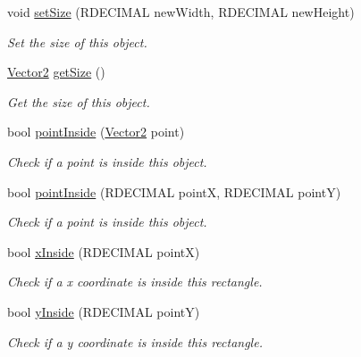 \begin{DoxyCompactItemize}
void \hyperlink{class_rad_j_a_v_1_1_rectangle_a0c7a61678b2d5b3b91207982f4895739}{set\+Size} (R\+D\+E\+C\+I\+M\+AL new\+Width, R\+D\+E\+C\+I\+M\+AL new\+Height)
\begin{DoxyCompactList}\small\item\em Set the size of this object. \end{DoxyCompactList}\item 
\hyperlink{class_rad_j_a_v_1_1_vector2}{Vector2} \hyperlink{class_rad_j_a_v_1_1_rectangle_aa7bc2edf2684ff541d2c82ad68372052}{get\+Size} ()
\begin{DoxyCompactList}\small\item\em Get the size of this object. \end{DoxyCompactList}\item 
bool \hyperlink{class_rad_j_a_v_1_1_rectangle_af111b7ca5c7ad9a400e1fddd80a919a7}{point\+Inside} (\hyperlink{class_rad_j_a_v_1_1_vector2}{Vector2} point)
\begin{DoxyCompactList}\small\item\em Check if a point is inside this object. \end{DoxyCompactList}\item 
bool \hyperlink{class_rad_j_a_v_1_1_rectangle_a2fe4cad690dd6c578955b67603f0d4b6}{point\+Inside} (R\+D\+E\+C\+I\+M\+AL pointX, R\+D\+E\+C\+I\+M\+AL pointY)
\begin{DoxyCompactList}\small\item\em Check if a point is inside this object. \end{DoxyCompactList}\item 
bool \hyperlink{class_rad_j_a_v_1_1_rectangle_a882ff8fd44095579f67dae65683d39e9}{x\+Inside} (R\+D\+E\+C\+I\+M\+AL pointX)
\begin{DoxyCompactList}\small\item\em Check if a x coordinate is inside this rectangle. \end{DoxyCompactList}\item 
bool \hyperlink{class_rad_j_a_v_1_1_rectangle_a59e72a4528f53e3eccf79cac079bb732}{y\+Inside} (R\+D\+E\+C\+I\+M\+AL pointY)
\begin{DoxyCompactList}\small\item\em Check if a y coordinate is inside this rectangle. \end{DoxyCompactList}\end{DoxyCompactItemize}
